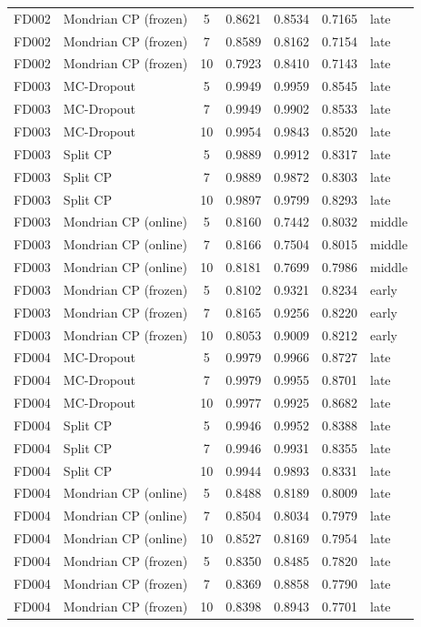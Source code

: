 \begin{table}[t]
\begin{tabular}{llcccc}
FD002 & Mondrian CP (frozen) & 5 & 0.8621 & 0.8534 & 0.7165 & late \\
FD002 & Mondrian CP (frozen) & 7 & 0.8589 & 0.8162 & 0.7154 & late \\
FD002 & Mondrian CP (frozen) & 10 & 0.7923 & 0.8410 & 0.7143 & late \\
FD003 & MC-Dropout & 5 & 0.9949 & 0.9959 & 0.8545 & late \\
FD003 & MC-Dropout & 7 & 0.9949 & 0.9902 & 0.8533 & late \\
FD003 & MC-Dropout & 10 & 0.9954 & 0.9843 & 0.8520 & late \\
FD003 & Split CP & 5 & 0.9889 & 0.9912 & 0.8317 & late \\
FD003 & Split CP & 7 & 0.9889 & 0.9872 & 0.8303 & late \\
FD003 & Split CP & 10 & 0.9897 & 0.9799 & 0.8293 & late \\
FD003 & Mondrian CP (online) & 5 & 0.8160 & 0.7442 & 0.8032 & middle \\
FD003 & Mondrian CP (online) & 7 & 0.8166 & 0.7504 & 0.8015 & middle \\
FD003 & Mondrian CP (online) & 10 & 0.8181 & 0.7699 & 0.7986 & middle \\
FD003 & Mondrian CP (frozen) & 5 & 0.8102 & 0.9321 & 0.8234 & early \\
FD003 & Mondrian CP (frozen) & 7 & 0.8165 & 0.9256 & 0.8220 & early \\
FD003 & Mondrian CP (frozen) & 10 & 0.8053 & 0.9009 & 0.8212 & early \\
FD004 & MC-Dropout & 5 & 0.9979 & 0.9966 & 0.8727 & late \\
FD004 & MC-Dropout & 7 & 0.9979 & 0.9955 & 0.8701 & late \\
FD004 & MC-Dropout & 10 & 0.9977 & 0.9925 & 0.8682 & late \\
FD004 & Split CP & 5 & 0.9946 & 0.9952 & 0.8388 & late \\
FD004 & Split CP & 7 & 0.9946 & 0.9931 & 0.8355 & late \\
FD004 & Split CP & 10 & 0.9944 & 0.9893 & 0.8331 & late \\
FD004 & Mondrian CP (online) & 5 & 0.8488 & 0.8189 & 0.8009 & late \\
FD004 & Mondrian CP (online) & 7 & 0.8504 & 0.8034 & 0.7979 & late \\
FD004 & Mondrian CP (online) & 10 & 0.8527 & 0.8169 & 0.7954 & late \\
FD004 & Mondrian CP (frozen) & 5 & 0.8350 & 0.8485 & 0.7820 & late \\
FD004 & Mondrian CP (frozen) & 7 & 0.8369 & 0.8858 & 0.7790 & late \\
FD004 & Mondrian CP (frozen) & 10 & 0.8398 & 0.8943 & 0.7701 & late \\
\bottomrule
\end{tabular}
\end{table}
